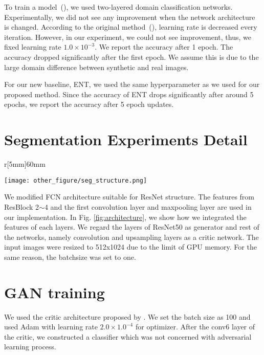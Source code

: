 \documentclass{article} \usepackage{iclr2018_conference,times}
\begin{document}
To train a model~(\cite{ganin2014unsupervised}), we used two-layered domain classification networks. Experimentally, we did not see any improvement when the network architecture is changed. According to the original method~(\cite{ganin2014unsupervised}), learning rate is decreased every iteration. However, in our experiment, we could not see improvement, thus, we fixed learning rate $1.0\times10^{-3}$. We report the accuracy after 1 epoch. The accuracy dropped significantly after the first epoch. We assume this is due to the large domain difference between synthetic and real images.

For our new baseline, ENT, we used the same hyperparameter as we used for our proposed method. Since the accuracy of ENT drops significantly after around 5 epochs, we report the accuracy after 5 epoch updates.
\vspace{-3mm}
\section{Segmentation Experiments Detail}
\vspace{-3mm}
\begin{wrapfigure}[11]{r}[5mm]{60mm}
  \begin{center}
    \vspace{-16mm}
  \texttt{[image: other\_figure/seg\_structure.png]}
  \end{center}
        \vspace{-4mm}
  \caption{Overview of architecture for semantic segmentation}

  \label{fig:architecture}
  \end{wrapfigure}
We modified FCN \cite{long2015fully} architecture suitable for ResNet structure. The features from ResBlock 2$\sim$4 and the first convolution layer and maxpooling layer are used in our implementation. In Fig. \ref{fig:architecture}, we show how we integrated the features of each layers. We regard the layers of ResNet50 as generator and rest of the networks, namely convolution and upsampling layers as a critic network. The input images were resized to 512x1024 due to the limit of GPU memory. For the same reason, the batchsize was set to one. 
\vspace{-3mm}
\section{GAN training}
\vspace{-3mm}
We used the critic architecture proposed by \cite{salimans2016improved}. We set the batch size as 100 and used Adam with learning rate $2.0\times1.0^{-4}$ for optimizer. 
After the conv6 layer of the critic, we constructed a classifier which was not concerned with adversarial learning process. 
\end{document}
